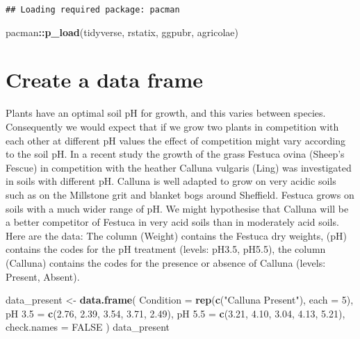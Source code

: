 \documentclass[
]{article}
\newenvironment{Shaded}{\begin{snugshade}}{\end{snugshade}}
\newcommand{\AttributeTok}[1]{\textcolor[rgb]{0.13,0.29,0.53}{#1}}
\newcommand{\ConstantTok}[1]{\textcolor[rgb]{0.56,0.35,0.01}{#1}}
\newcommand{\DecValTok}[1]{\textcolor[rgb]{0.00,0.00,0.81}{#1}}
\newcommand{\FloatTok}[1]{\textcolor[rgb]{0.00,0.00,0.81}{#1}}
\newcommand{\FunctionTok}[1]{\textcolor[rgb]{0.13,0.29,0.53}{\textbf{#1}}}
\newcommand{\NormalTok}[1]{#1}
\newcommand{\OtherTok}[1]{\textcolor[rgb]{0.56,0.35,0.01}{#1}}
\newcommand{\SpecialCharTok}[1]{\textcolor[rgb]{0.81,0.36,0.00}{\textbf{#1}}}
\newcommand{\StringTok}[1]{\textcolor[rgb]{0.31,0.60,0.02}{#1}}
\begin{document}
\begin{verbatim}
## Loading required package: pacman
\end{verbatim}

\begin{Shaded}
\begin{Highlighting}[]
\NormalTok{pacman}\SpecialCharTok{::}\FunctionTok{p\_load}\NormalTok{(tidyverse, rstatix, ggpubr, agricolae)}
\end{Highlighting}
\end{Shaded}

\hypertarget{create-a-data-frame}{%
\section{Create a data frame}\label{create-a-data-frame}}

Plants have an optimal soil pH for growth, and this varies between
species. Consequently we would expect that if we grow two plants in
competition with each other at different pH values the effect of
competition might vary according to the soil pH. In a recent study the
growth of the grass Festuca ovina (Sheep's Fescue) in competition with
the heather Calluna vulgaris (Ling) was investigated in soils with
different pH. Calluna is well adapted to grow on very acidic soils such
as on the Millstone grit and blanket bogs around Sheffield. Festuca
grows on soils with a much wider range of pH. We might hypothesise that
Calluna will be a better competitor of Festuca in very acid soils than
in moderately acid soils. Here are the data: The column (Weight)
contains the Festuca dry weights, (pH) contains the codes for the pH
treatment (levels: pH3.5, pH5.5), the column (Calluna) contains the
codes for the presence or absence of Calluna (levels: Present, Absent).

\begin{Shaded}
\begin{Highlighting}[]
\NormalTok{data\_present }\OtherTok{\textless{}{-}} \FunctionTok{data.frame}\NormalTok{(}
  \AttributeTok{Condition =} \FunctionTok{rep}\NormalTok{(}\FunctionTok{c}\NormalTok{(}\StringTok{"Calluna Present"}\NormalTok{), }\AttributeTok{each =} \DecValTok{5}\NormalTok{),}
  \StringTok{\textasciigrave{}}\AttributeTok{pH 3.5}\StringTok{\textasciigrave{}} \OtherTok{=} \FunctionTok{c}\NormalTok{(}\FloatTok{2.76}\NormalTok{, }\FloatTok{2.39}\NormalTok{, }\FloatTok{3.54}\NormalTok{, }\FloatTok{3.71}\NormalTok{, }\FloatTok{2.49}\NormalTok{),}
  \StringTok{\textasciigrave{}}\AttributeTok{pH 5.5}\StringTok{\textasciigrave{}} \OtherTok{=} \FunctionTok{c}\NormalTok{(}\FloatTok{3.21}\NormalTok{, }\FloatTok{4.10}\NormalTok{, }\FloatTok{3.04}\NormalTok{, }\FloatTok{4.13}\NormalTok{, }\FloatTok{5.21}\NormalTok{),}
  \AttributeTok{check.names =} \ConstantTok{FALSE}
\NormalTok{)}
\NormalTok{data\_present}
\end{Highlighting}
\end{Shaded}
\end{document}

